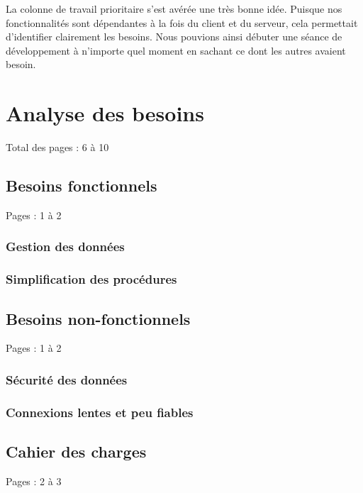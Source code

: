 \documentclass{EPL-master-thesis-covers-FR}
\begin{document}
				La colonne de travail prioritaire s'est avérée une très bonne idée. Puisque nos fonctionnalités sont dépendantes à la fois du client et du serveur, cela permettait d'identifier clairement les besoins. Nous pouvions ainsi débuter une séance de développement à n'importe quel moment en sachant ce dont les autres avaient besoin.



	\chapter{Analyse des besoins}
		\label{sec:analyse_besoins}
		Total des pages : 6 à 10

		\section{Besoins fonctionnels}

			Pages : 1 à 2

			\subsection*{Gestion des données}
			\subsection*{Simplification des procédures}

		\section{Besoins non-fonctionnels}

			Pages : 1 à 2

			\subsection*{Sécurité des données}
			\subsection*{Connexions lentes et peu fiables}

		\section{Cahier des charges}
			\label{sec:cahier_des_charges}

			Pages : 2 à 3
\end{document}
